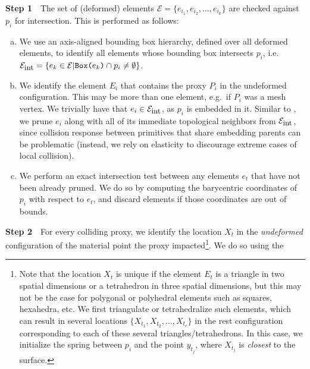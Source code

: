 \textbf{Step 1}\ \ The set of (deformed) elements $\mathcal
  E=\{e_{i_1},e_{i_2},\ldots,e_{i_k}\}$ are checked against $p_i$ for intersection. This is performed as follows:

  \begin{enumerate}[(a)]
    \item We use an axis-aligned bounding box
    hierarchy, defined over all deformed elements, to identify all
    elements whose bounding box intersects $p_i$, i.e.\
    $\mathcal{E}_{\mbox{\small
        int}}=\{e_k\in\mathcal{E}|\texttt{Box(}e_k\texttt{)}\cap
    p_i\neq\emptyset\}$.

    \item We identify the element $E_i$ that contains the proxy
    $P_i$ in the undeformed configuration. This may be more than one element,
    e.g.\ if $P_i$ was a mesh vertex. We trivially have that
    $e_i\in\mathcal{E}_{\mbox{\small int}}$, as $p_i$ is embedded in it.
    Similar to \citet{McAdaZSETTS:2011}, we prune $e_i$ along with all of its immediate topological neighbors from
    $\mathcal{E}_{\mbox{\small int}}$, since collision response between
    primitives that share embedding parents can be problematic
    (instead, we rely on
    elasticity to discourage extreme cases of local collision).


    \item We perform an exact intersection test
    between any elements $e_t$ that have not been already pruned. We
    do so by computing the barycentric coordinates of $p_i$ with
    respect to $e_t$, and discard elements if those coordinates are
    out of bounds.

  \end{enumerate}
   \textbf{Step 2}\ \ For every colliding proxy, we
  identify the location $X_t$ in the \emph{undeformed} configuration
  of the material point the proxy impacted\footnote{Note that the location $X_t$ is unique if the element
$E_t$ is a triangle in two spatial dimensions or a tetrahedron in
three spatial dimensions, but this may not be the case for polygonal
or polyhedral elements such as squares, hexahedra, etc. We first
triangulate or tetrahedralize such elements, which can result in
several locations $\{X_{t_1},X_{t_2},\ldots,X_{t_r}\}$ in the rest
configuration corresponding to each of these several
triangles/tetrahedrons. In this case, we initialize the spring between
$p_i$ and the point $y_{t_j}$, where $X_{t_j}$ is \emph{closest} to
the surface.}. We do so using the
